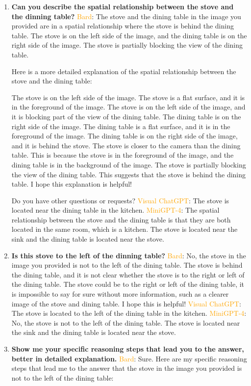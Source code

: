 \begin{enumerate}
    \item \textbf{Can you describe the spatial relationship between the stove and the dinning table?}
    \subitem \textcolor{orange}{Bard}: 
    The stove and the dining table in the image you provided are in a spatial relationship where the stove is behind the dining table. The stove is on the left side of the image, and the dining table is on the right side of the image. The stove is partially blocking the view of the dining table.
    
    Here is a more detailed explanation of the spatial relationship between the stove and the dining table:
    
    The stove is on the left side of the image. The stove is a flat surface, and it is in the foreground of the image. The stove is on the left side of the image, and it is blocking part of the view of the dining table.
    The dining table is on the right side of the image. The dining table is a flat surface, and it is in the foreground of the image. The dining table is on the right side of the image, and it is behind the stove.
    The stove is closer to the camera than the dining table. This is because the stove is in the foreground of the image, and the dining table is in the background of the image.
    The stove is partially blocking the view of the dining table. This suggests that the stove is behind the dining table.
    I hope this explanation is helpful!
    
    Do you have other questions or requests?
    \subitem \textcolor{orange}{Visual ChatGPT}: The stove is located near the dining table in the kitchen.
    \subitem \textcolor{orange}{MiniGPT-4}: The spatial relationship between the stove and the dining table is that they are both located in the same room, which is a kitchen. The stove is located near the sink and the dining table is located near the stove.
    \item \textbf{Is this stove to the left of the dinning table?}
    \subitem \textcolor{orange}{Bard}: 
    No, the stove in the image you provided is not to the left of the dining table. The stove is behind the dining table, and it is not clear whether the stove is to the right or left of the dining table.
    The stove could be to the right or left of the dining table, it is impossible to say for sure without more information, such as a clearer image of the stove and dining table.
    I hope this is helpful! 
    \subitem \textcolor{orange}{Visual ChatGPT}: The stove is located to the left of the dining table in the kitchen.
    \subitem \textcolor{orange}{MiniGPT-4}: No, the stove is not to the left of the dining table. The stove is located near the sink and the dining table is located near the stove.
    \item \textbf{Show me your specific reasoning steps that lead you to the answer, better in detailed explanation.}
    \subitem \textcolor{orange}{Bard}: 
    Sure. Here are my specific reasoning steps that lead me to the answer that the stove in the image you provided is not to the left of the dining table:
    

\end{enumerate}
